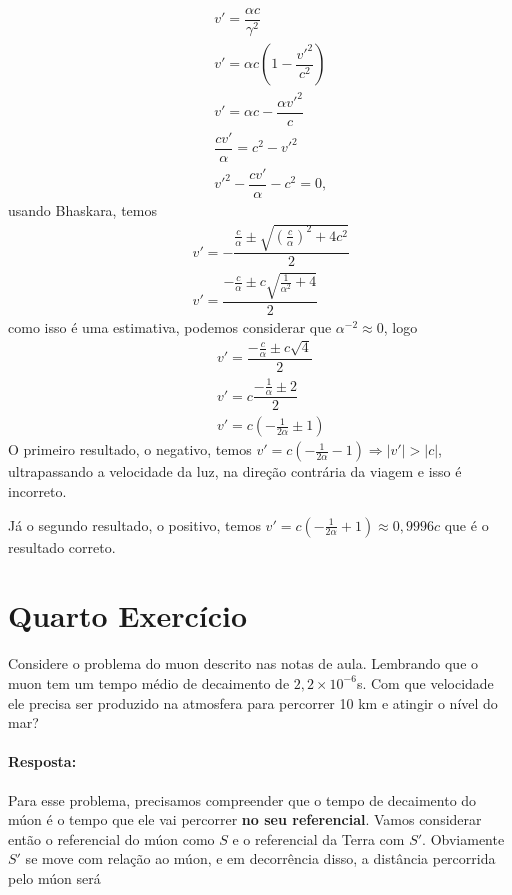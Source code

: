 \documentclass[10pt,a4paper]{article}
\begin{document}
	\begin{eqnarray}
	    && v' = \dfrac{\alpha c}{\gamma^2}\nonumber \\
		&& v' = \alpha c \left( 1 - \dfrac{v'^2}{c^2}\right) \nonumber \\
		&& v'  =  \alpha c - \dfrac{ \alpha v'^2}{c} \nonumber \\		
		&& \dfrac{ c v'}{\alpha} = c^2 - v'^2 \nonumber \\
		&& v'^2 - \dfrac{ c v'}{\alpha} - c^2 = 0, \nonumber
	\end{eqnarray}
	usando Bhaskara, temos
	\begin{eqnarray}
		&& v' = -\dfrac{\frac{c}{\alpha} \pm \sqrt{\left(\frac{c}{\alpha}\right)^2 +4c^2}}{2} \nonumber \\
		&& v' = \dfrac{-\frac{c}{\alpha} \pm c\sqrt{\frac{1}{\alpha^2} +4}}{2} \nonumber 
	\end{eqnarray}
	como isso é uma estimativa, podemos considerar que $ \alpha^{-2} \approx 0 $, logo
	\begin{eqnarray}
		&& v' = \dfrac{-\frac{c}{\alpha} \pm c\sqrt{4}}{2} \nonumber \\
		&& v' = c\dfrac{-\frac{1}{\alpha} \pm 2}{2} \nonumber\\
		&& v' = c\left(-\frac{1}{2\alpha} \pm 1\right) \nonumber 
	\end{eqnarray}
	O primeiro resultado, o negativo, temos
	$ v' = c\left(-\frac{1}{2\alpha} - 1\right) \Longrightarrow |v'| > |c|$, ultrapassando a velocidade da luz, na direção contrária da viagem e isso é incorreto.
	
	Já o segundo resultado, o positivo, temos
	$ v' = c\left(-\frac{1}{2\alpha} + 1\right) \approx 0,9996 c$ que é o resultado correto.

	
	\section{Quarto Exercício}	
	Considere o problema do muon descrito nas notas de aula. Lembrando que o muon tem um tempo médio de decaimento de $2,2\times 10^{-6}$s. Com que
	velocidade ele precisa ser produzido na atmosfera para percorrer 10 km e atingir o nível do mar?
	
	\paragraph{Resposta:}
	Para esse problema, precisamos compreender que o tempo de  decaimento do múon é o tempo que ele vai percorrer \textbf{no seu referencial}. Vamos considerar então o referencial do múon como \(S\) e o referencial da Terra com \(S'\). Obviamente \(S'\) se move com relação ao múon, e em decorrência disso, a distância percorrida pelo múon será 
	
\end{document}
